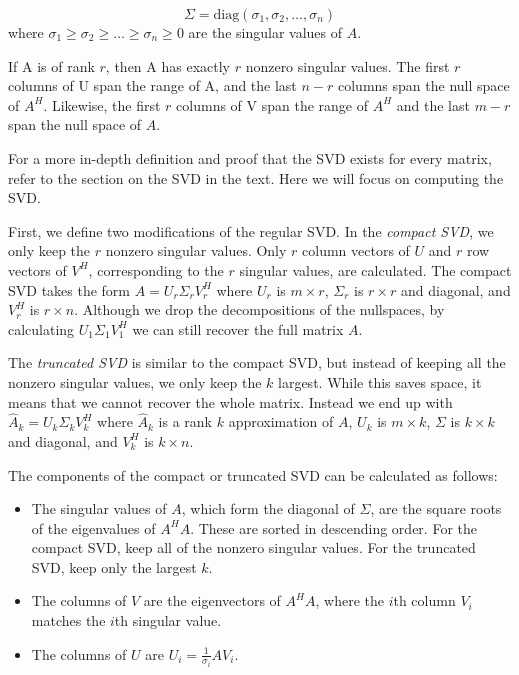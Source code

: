 \begin{equation*}
\Sigma = \mbox{diag}(\sigma_1,\sigma_2,\ldots,\sigma_n)
\end{equation*}
where $\sigma_1 \geq \sigma_2 \geq \ldots \geq \sigma_n \geq 0$ are the singular values of $A$.

If A is of rank $r$, then A has exactly $r$ nonzero singular values.
The first $r$ columns of U span the range of A, and the last $n -r$ columns span the null space of $A^H$.
Likewise, the first $r$ columns of V span the range of $A^H$ and the last $m - r$ span the null space of $A$.

For a more in-depth definition and proof that the SVD exists for every matrix, refer to the section on the SVD in the text.
Here we will focus on computing the SVD. 

First, we define two modifications of the regular SVD.
In the \emph{compact SVD}, we only keep the $r$ nonzero singular values.
Only $r$ column vectors of $U$ and $r$ row vectors of $V^H$, corresponding to the $r$ singular values, are calculated.
The compact SVD takes the form $A= U_r \Sigma_r V_r^H$ where $U_r$ is $m\times r$, $\Sigma_r$ is $r\times r$ and diagonal, and $V_r^H$ is $r\times n$.
Although we drop the decompositions of the nullspaces, by calculating $U_1 \Sigma_1 V_1^H$ we can still recover the full matrix $A$.

The \emph{truncated SVD} is similar to the compact SVD, but instead of keeping all the nonzero singular values, we only keep the $k$ largest.
While this saves space, it means that we cannot recover the whole matrix.
Instead we end up with $\widehat A_k = U_k\Sigma_k V_k^H$ where $\widehat A_k$ is a rank $k$ approximation of $A$, $U_k$ is $m\times k$, $\Sigma$ is $k \times k$ and diagonal, and $V_k^H$ is $k \times n$.

The components of the compact or truncated SVD can be calculated as follows:
\begin{itemize}
\item The singular values of $A$, which form the diagonal of $\Sigma$, are the square roots of the eigenvalues of $A^HA$. 
These are sorted in descending order. 
For the compact SVD, keep all of the nonzero singular values. 
For the truncated SVD, keep only the largest $k$.
\item The columns of $V$ are the eigenvectors of $A^HA$, where the $i$th column $V_i$ matches the $i$th singular value.
\item The columns of $U$ are $U_i = \frac{1}{\sigma_i} AV_i$.
\end{itemize}

